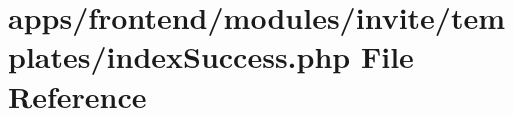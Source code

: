 \hypertarget{frontend_2modules_2invite_2templates_2index_success_8php}{\section{apps/frontend/modules/invite/templates/index\-Success.php File Reference}
\label{frontend_2modules_2invite_2templates_2index_success_8php}
}

